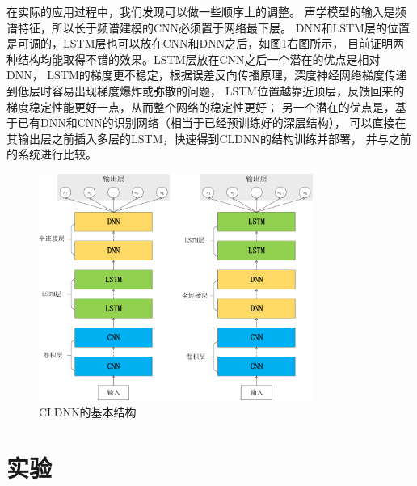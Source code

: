 在实际的应用过程中，我们发现可以做一些顺序上的调整。
声学模型的输入是频谱特征，所以长于频谱建模的CNN必须置于网络最下层。
DNN和LSTM层的位置是可调的，LSTM层也可以放在CNN和DNN之后，如图\ref{fig:cldnn}右图所示，
目前证明两种结构均能取得不错的效果。LSTM层放在CNN之后一个潜在的优点是相对DNN，
LSTM的梯度更不稳定，根据误差反向传播原理，深度神经网络梯度传递到低层时容易出现梯度爆炸或弥散的问题，
LSTM位置越靠近顶层，反馈回来的梯度稳定性能更好一点，从而整个网络的稳定性更好；
另一个潜在的优点是，基于已有DNN和CNN的识别网络（相当于已经预训练好的深层结构），
可以直接在其输出层之前插入多层的LSTM，快速得到CLDNN的结构训练并部署，
并与之前的系统进行比较。


\begin{figure}
\centering
\includegraphics[width=0.8\textwidth]{figures/chapter3/cldnn-crop}
\caption{CLDNN的基本结构}
\label{fig:cldnn}
\end{figure}


\section{实验} 
